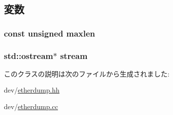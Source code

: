 \subsection{変数}
\hypertarget{classEtherDump_a116bcd76790af971de65d742bdb8feac}{
\subsubsection[{maxlen}]{\setlength{\rightskip}{0pt plus 5cm}const unsigned {\bf maxlen}}}
\label{classEtherDump_a116bcd76790af971de65d742bdb8feac}
\hypertarget{classEtherDump_adc3bdd1632f41d809c78a20c0733715c}{
\subsubsection[{stream}]{\setlength{\rightskip}{0pt plus 5cm}std::ostream$\ast$ {\bf stream}}}
\label{classEtherDump_adc3bdd1632f41d809c78a20c0733715c}


このクラスの説明は次のファイルから生成されました:\begin{DoxyCompactItemize}
\item 
dev/\hyperlink{etherdump_8hh}{etherdump.hh}\item 
dev/\hyperlink{etherdump_8cc}{etherdump.cc}\end{DoxyCompactItemize}

